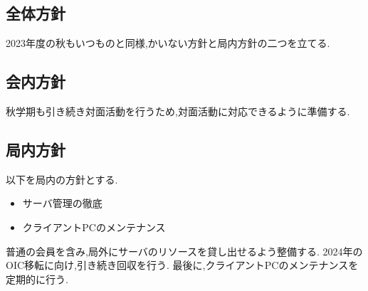 \subsection*{全体方針}


2023年度の秋もいつものと同様,かいない方針と局内方針の二つを立てる.

\subsection{会内方針}
秋学期も引き続き対面活動を行うため,対面活動に対応できるように準備する.

\subsection{局内方針}
以下を局内の方針とする.
\begin{itemize}
    \item サーバ管理の徹底
    \item クライアントPCのメンテナンス
\end{itemize}
普通の会員を含み,局外にサーバのリソースを貸し出せるよう整備する.
2024年のOIC移転に向け,引き続き回収を行う.
最後に,クライアントPCのメンテナンスを定期的に行う.
